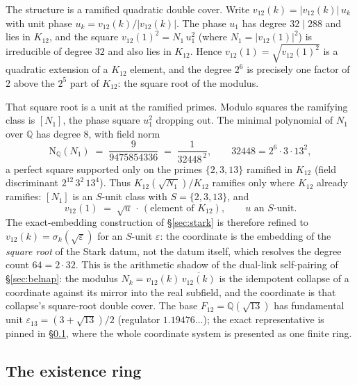 \documentclass[12pt,a4paper]{article}
\begin{document}
The structure is a ramified quadratic double cover.  Write $v_{12}(k) = |v_{12}(k)|\,u_k$
with unit phase $u_k = v_{12}(k)/|v_{12}(k)|$.  The phase $u_1$ has degree $32 \mid 288$
and lies in $K_{12}$, and the square $v_{12}(1)^2 = N_1\,u_1^2$ (where $N_1 = |v_{12}(1)|^2$)
is irreducible of degree $32$ and also lies in $K_{12}$.  Hence
$v_{12}(1) = \sqrt{v_{12}(1)^2}$ is a quadratic extension of a $K_{12}$ element, and the
degree $2^6$ is precisely one factor of $2$ above the $2^5$ part of $K_{12}$: the square
root of the modulus.

That square root is a unit at the ramified primes.  Modulo squares the ramifying class is
$[N_1]$, the phase square $u_1^2$ dropping out.  The minimal polynomial of $N_1$ over
$\mathbb{Q}$ has degree $8$, with field norm
\[
\mathrm{N}_{\mathbb{Q}}(N_1) \;=\; \frac{9}{9475854336} \;=\; \frac{1}{32448^{\,2}},
\qquad 32448 = 2^6\cdot 3\cdot 13^2,
\]
a perfect square supported only on the primes $\{2,3,13\}$ ramified in $K_{12}$
(field discriminant $2^{12}\,3^2\,13^4$).  Thus $K_{12}(\sqrt{N_1})/K_{12}$ ramifies only
where $K_{12}$ already ramifies: $[N_1]$ is an $S$-unit class with $S = \{2,3,13\}$, and
\[
v_{12}(1) \;=\; \sqrt{u}\,\cdot\,(\text{element of } K_{12}),
\qquad u \text{ an } S\text{-unit.}
\]
The exact-embedding construction of \S\ref{sec:stark} is therefore refined to
$v_{12}(k) = \sigma_k(\sqrt{\varepsilon})$ for an $S$-unit $\varepsilon$: the coordinate is
the embedding of the \emph{square root} of the Stark datum, not the datum itself, which
resolves the degree count $64 = 2\cdot 32$.  This is the arithmetic shadow of the
dual-link self-pairing of \S\ref{sec:belnap}: the modulus
$N_k = v_{12}(k)\,\overline{v_{12}(k)}$ is the idempotent collapse of a coordinate against
its mirror into the real subfield, and the coordinate is that collapse's square-root
double cover.  The base $F_{12} = \mathbb{Q}(\sqrt{13})$ has fundamental unit
$\varepsilon_{13} = (3+\sqrt{13})/2$ (regulator $1.19476\ldots$); the exact
representative is pinned in \S\ref{subsec:ring}, where the whole coordinate system
is presented as one finite ring.

\subsection{The existence ring}
\label{subsec:ring}
\end{document}
